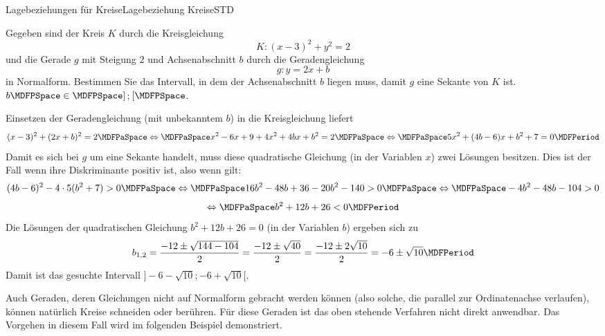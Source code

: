\begin{MXContent}{Lagebeziehungen für Kreise}{Lagebeziehung Kreise}{STD}
\begin{MExercise}
\begin{MHint}{\iSolution}
\begin{MExerciseItems}
{}
\end{MExerciseItems}
 
\end{MHint}

\end{MExercise}


\begin{MExercise}
Gegeben sind der Kreis $K$ durch die Kreisgleichung
\[
 K\colon (x-3)^2+y^2=2
\]
und die Gerade $g$ mit Steigung $2$ und Achsenabschnitt $b$ durch die Geradengleichung
\[
 g\colon y=2x+b
\]
in Normalform. Bestimmen Sie das Intervall, in dem der Achsenabschnitt $b$ liegen muss, damit $g$ eine Sekante von $K$ ist.\\
$b\MDFPSpace \in \MDFPSpace ]$$;$$[ \MDFPSpace$.


\begin{MHint}{\iSolution}
Einsetzen der Geradengleichung (mit unbekanntem $b$) in die Kreisgleichung liefert
\[
 (x-3)^2+(2x+b)^2=2\MDFPaSpace\Leftrightarrow\MDFPaSpace x^2-6x+9+4x^2+4b x+b^2=2\MDFPaSpace\Leftrightarrow\MDFPaSpace 5x^2+(4b-6)x+b^2+7=0 \MDFPeriod
\]
Damit es sich bei $g$ um eine Sekante handelt, muss diese quadratische Gleichung (in der Variablen $x$) zwei Lösungen besitzen. Dies ist der Fall wenn ihre Diskriminante positiv ist, also wenn gilt:
\[
 (4b-6)^2-4\cdot 5(b^2+7)>0\MDFPaSpace\Leftrightarrow\MDFPaSpace 16b^2-48b+36-20b^2-140>0\MDFPaSpace\Leftrightarrow\MDFPaSpace -4b^2-48b-104>0
\]
\[
 \Leftrightarrow\MDFPaSpace b^2+12b+26<0\MDFPeriod
\]
Die Lösungen der quadratischen Gleichung $b^2+12b+26=0$ (in der Variablen $b$) ergeben sich zu 
\[
 b_{1,2}=\frac{-12\pm\sqrt{144-104}}{2}=\frac{-12\pm\sqrt{40}}{2}=\frac{-12\pm2\sqrt{10}}{2}=-6\pm\sqrt{10} \MDFPeriod
\]
Damit ist das gesuchte Intervall $]-6-\sqrt{10};-6+\sqrt{10}[$.
\end{MHint}
\end{MExercise}

Auch Geraden, deren Gleichungen nicht auf Normalform gebracht werden können (also solche, die parallel zur Ordinatenachse verlaufen), können natürlich Kreise schneiden oder berühren. Für diese Geraden ist das oben stehende Verfahren nicht direkt anwendbar. Das Vorgehen in diesem Fall wird im folgenden Beispiel demonstriert.


\end{MXContent}

